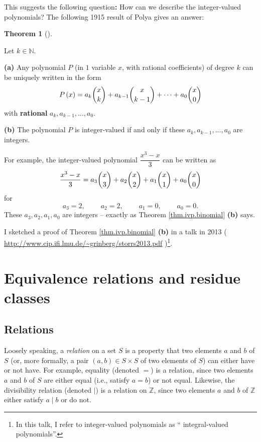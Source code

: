 \documentclass[numbers=enddot,12pt,final,onecolumn,notitlepage]{scrartcl}%
\numberwithin{exer}{subsection}
\theoremstyle{definition}
\newtheorem{theo}{Theorem}[subsection]
\newenvironment{theorem}[1][]
{\begin{theo}[#1]\begin{leftbar}}
{\end{leftbar}\end{theo}}
\begin{document}
This suggests the following question\textbf{:} How can we describe the
integer-valued polynomials? The following 1915 result of Polya gives an answer:

\begin{theorem}
\label{thm.ivp.binomial}Let $k\in\mathbb{N}$.

\textbf{(a)} Any polynomial $P$ (in $1$ variable $x$, with rational
coefficients) of degree $k$ can be uniquely written in the form%
\[
P\left(  x\right)  =a_{k}\dbinom{x}{k}+a_{k-1}\dbinom{x}{k-1}+\cdots
+a_{0}\dbinom{x}{0}%
\]
with \textbf{rational} $a_{k},a_{k-1},\ldots,a_{0}$.

\textbf{(b)} The polynomial $P$ is integer-valued if and only if these
$a_{k},a_{k-1},\ldots,a_{0}$ are integers.
\end{theorem}

For example, the integer-valued polynomial $\dfrac{x^{3}-x}{3}$ can be written
as%
\[
\dfrac{x^{3}-x}{3}=a_{3}\dbinom{x}{3}+a_{2}\dbinom{x}{2}+a_{1}\dbinom{x}%
{1}+a_{0}\dbinom{x}{0}%
\]
for
\[
a_{3}=2,\ \ \ \ \ \ \ \ \ \ a_{2}=2,\ \ \ \ \ \ \ \ \ \ a_{1}%
=0,\ \ \ \ \ \ \ \ \ \ a_{0}=0.
\]
These $a_{3},a_{2},a_{1},a_{0}$ are integers -- exactly as Theorem
\ref{thm.ivp.binomial} \textbf{(b)} says.

I sketched a proof of Theorem \ref{thm.ivp.binomial} \textbf{(b)} in a talk in
2013 ( \url{http://www.cip.ifi.lmu.de/~grinberg/storrs2013.pdf} )\footnote{In
this talk, I refer to integer-valued polynomials as \textquotedblleft
integral-valued polynomials\textquotedblright.}.

\section{Equivalence relations and residue classes}

\subsection{Relations}

Loosely speaking, a \textit{relation} on a set $S$ is a property that two
elements $a$ and $b$ of $S$ (or, more formally, a pair $\left(  a,b\right)
\in S\times S$ of two elements of $S$) can either have or not have. For
example, equality (denoted $=$) is a relation, since two elements $a$ and $b$
of $S$ are either equal (i.e., satisfy $a=b$) or not equal. Likewise, the
divisibility relation (denoted $\mid$) is a relation on $\mathbb{Z}$, since
two elements $a$ and $b$ of $\mathbb{Z}$ either satisfy $a\mid b$ or do not.
\end{document}

